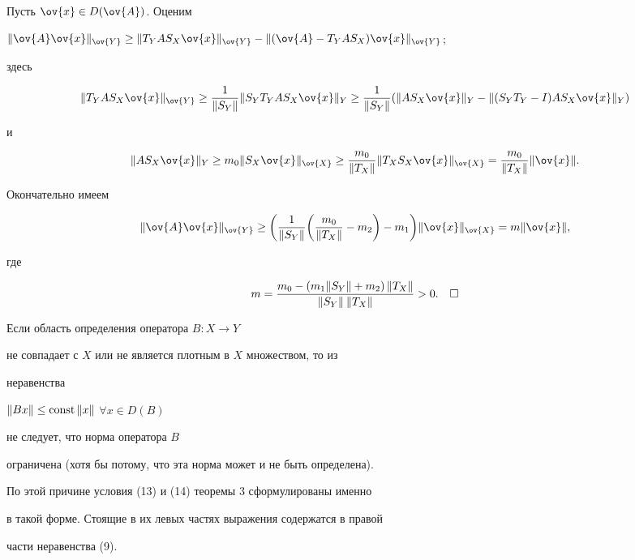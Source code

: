 Пусть $\ov{x}\in D(\ov{A})$. Оценим


$\nr{\ov{A}\ov{x}}_{\ov{Y}} \ge \nr{T_YAS_X\ov{x}}_{\ov{Y}}


 - \nr{(\ov{A} -T_YAS_X)\ov{x}}_{\ov{Y}}$;


здесь


$$


\nr{T_YAS_X\ov{x}}_{\ov{Y}}\ge\frac{1}{\nr{S_Y}}\nr{S_YT_YAS_X\ov{x}}_Y\ge


\frac{1}{\nr{S_Y}}


( \nr{AS_X\ov{x}}_Y - \nr{(S_YT_Y-I)AS_X\ov{x}}_Y)


$$


и


$$


\nr{AS_X\ov{x}}_Y \ge m_0 \nr{S_X\ov{x}}_{\ov{X}}


\ge \frac{m_0}{\nr{T_X}} \nr{T_XS_X\ov{x}}_{\ov{X}}


= \frac{m_0}{\nr{T_X}} \nr{\ov{x}}.


$$


Окончательно имеем


$$


\nr{\ov{A}\ov{x}}_{\ov{Y}} \ge


\bigg( \frac{1}{\nr{S_Y}}\bigg(\frac{m_0}{\nr{T_X}}-m_2\bigg)-m_1\bigg)


\nr{\ov{x}}_{\ov{X}} = m\nr{\ov{x}},


$$


где


$$


m = \frac{m_0-(m_1\nr{S_Y}+m_2)\,\nr{T_X}}{\nr{S_Y}\:\nr{T_X}} >0.


\quad\square


$$





\begin{notenonum} Если область определения оператора $B:X \to Y$


не совпадает с $X$ или не является плотным в $X$ множеством, то из


неравенства


$\| {Bx} \| \le \text{const}\,\| {x} \|$ $\forall x\in D(B)$


не следует, что норма оператора $B$


ограничена (хотя бы потому, что эта норма может и не быть определена).


По этой причине условия (13) и (14) теоремы 3 сформулированы именно


в такой форме. Стоящие в их левых частях выражения содержатся в правой


части неравенства (9).


\end{notenonum}





